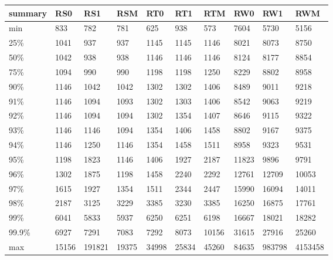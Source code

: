 \begin{tabular}{llllllllll}
\toprule
summary &    RS0 &     RS1 &    RSM &    RT0 &    RT1 &    RTM &    RW0 &     RW1 &      RWM \\
\midrule
    min &    833 &     782 &    781 &    625 &    938 &    573 &   7604 &    5730 &     5156 \\
    25\% &   1041 &     937 &    937 &   1145 &   1145 &   1146 &   8021 &    8073 &     8750 \\
    50\% &   1042 &     938 &    938 &   1146 &   1146 &   1146 &   8124 &    8177 &     8854 \\
    75\% &   1094 &     990 &    990 &   1198 &   1198 &   1250 &   8229 &    8802 &     8958 \\
    90\% &   1146 &    1042 &   1042 &   1302 &   1302 &   1406 &   8489 &    9011 &     9218 \\
    91\% &   1146 &    1094 &   1093 &   1302 &   1303 &   1406 &   8542 &    9063 &     9219 \\
    92\% &   1146 &    1094 &   1094 &   1302 &   1354 &   1407 &   8646 &    9115 &     9322 \\
    93\% &   1146 &    1146 &   1094 &   1354 &   1406 &   1458 &   8802 &    9167 &     9375 \\
    94\% &   1146 &    1250 &   1146 &   1354 &   1458 &   1511 &   8958 &    9323 &     9531 \\
    95\% &   1198 &    1823 &   1146 &   1406 &   1927 &   2187 &  11823 &    9896 &     9791 \\
    96\% &   1302 &    1875 &   1198 &   1458 &   2240 &   2292 &  12761 &   12709 &    10053 \\
    97\% &   1615 &    1927 &   1354 &   1511 &   2344 &   2447 &  15990 &   16094 &    14011 \\
    98\% &   2187 &    3125 &   3229 &   3385 &   3230 &   3385 &  16250 &   16875 &    17761 \\
    99\% &   6041 &    5833 &   5937 &   6250 &   6251 &   6198 &  16667 &   18021 &    18282 \\
  99.9\% &   6927 &    7291 &   7083 &   7292 &   8073 &  10156 &  31615 &   27916 &    25260 \\
    max &  15156 &  191821 &  19375 &  34998 &  25834 &  45260 &  84635 &  983798 &  4153458 \\
\bottomrule
\end{tabular}
